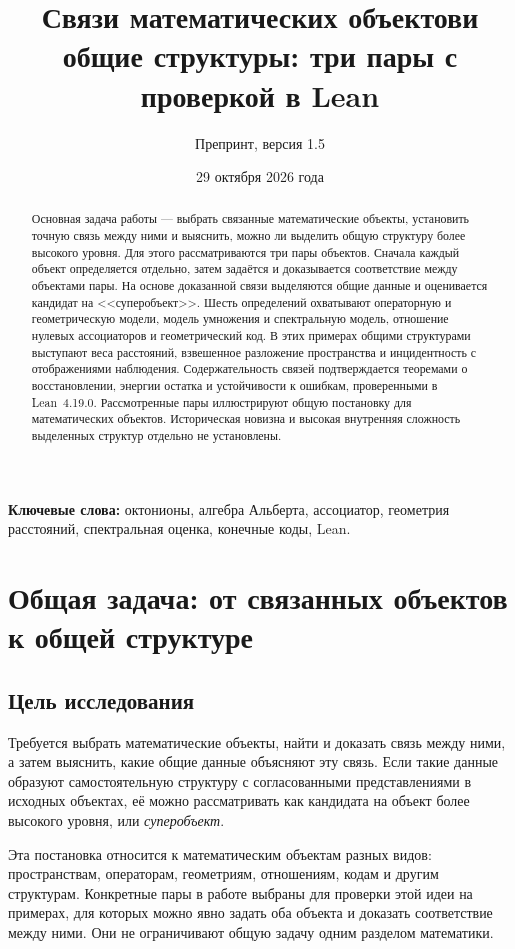 \documentclass[11pt,a4paper]{article}
\title{Связи математических объектов\newline и общие структуры:\newline
три пары с проверкой в Lean}
\author{\small Препринт, версия 1.5}
\date{29 октября 2026 года}
\numberwithin{equation}{section}
\theoremstyle{definition}
\theoremstyle{remark}
\begin{document}
\maketitle
\begin{abstract}
Основная задача работы --- выбрать связанные математические объекты,
установить точную связь между ними и выяснить, можно ли выделить
общую структуру более высокого уровня. Для этого рассматриваются
три пары объектов. Сначала каждый объект определяется отдельно,
затем задаётся и доказывается соответствие между объектами пары.
На основе доказанной связи выделяются общие данные и оценивается
кандидат на <<суперобъект>>. Шесть определений охватывают операторную
и геометрическую модели, модель умножения и спектральную модель,
отношение нулевых ассоциаторов и геометрический код. В этих примерах
общими структурами выступают веса расстояний, взвешенное разложение
пространства и инцидентность с отображениями наблюдения.
Содержательность связей подтверждается теоремами о восстановлении,
энергии остатка и устойчивости к ошибкам, проверенными в Lean~4.19.0.
Рассмотренные пары иллюстрируют общую постановку для математических
объектов. Историческая новизна и высокая внутренняя сложность
выделенных структур отдельно не установлены.
\end{abstract}
\noindent\textbf{Ключевые слова:} октонионы, алгебра Альберта, ассоциатор,
геометрия расстояний, спектральная оценка, конечные коды, Lean.

\section{Общая задача: от связанных объектов к общей структуре}
\subsection{Цель исследования}
Требуется выбрать математические объекты, найти и доказать связь
между ними, а затем выяснить, какие общие данные объясняют эту связь.
Если такие данные образуют самостоятельную структуру с согласованными
представлениями в исходных объектах, её можно рассматривать как
кандидата на объект более высокого уровня, или \emph{суперобъект}.

Эта постановка относится к математическим объектам разных видов:
пространствам, операторам, геометриям, отношениям, кодам и другим
структурам. Конкретные пары в работе выбраны для проверки этой идеи
на примерах, для которых можно явно задать оба объекта и доказать
соответствие между ними. Они не ограничивают общую задачу одним
разделом математики.
\end{document}
